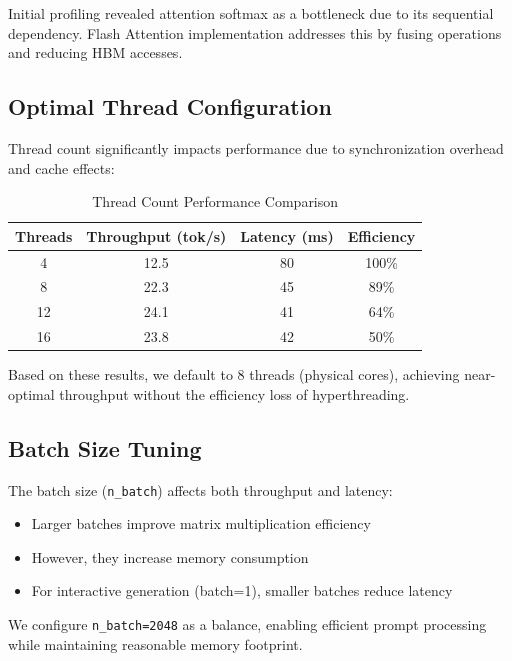 Initial profiling revealed attention softmax as a bottleneck due to its sequential dependency. Flash Attention implementation addresses this by fusing operations and reducing HBM accesses.

\subsection{Optimal Thread Configuration}

Thread count significantly impacts performance due to synchronization overhead and cache effects:

\begin{table}[h]
\centering
\caption{Thread Count Performance Comparison}
\label{tab:thread_comparison}
\begin{tabular}{cccc}
\toprule
\textbf{Threads} & \textbf{Throughput (tok/s)} & \textbf{Latency (ms)} & \textbf{Efficiency} \\
\midrule
4 & 12.5 & 80 & 100\% \\
8 & 22.3 & 45 & 89\% \\
12 & 24.1 & 41 & 64\% \\
16 & 23.8 & 42 & 50\% \\
\bottomrule
\end{tabular}
\end{table}

Based on these results, we default to 8 threads (physical cores), achieving near-optimal throughput without the efficiency loss of hyperthreading.

\subsection{Batch Size Tuning}

The batch size (\texttt{n\_batch}) affects both throughput and latency:

\begin{itemize}
    \item Larger batches improve matrix multiplication efficiency
    \item However, they increase memory consumption
    \item For interactive generation (batch=1), smaller batches reduce latency
\end{itemize}

We configure \texttt{n\_batch=2048} as a balance, enabling efficient prompt processing while maintaining reasonable memory footprint.
